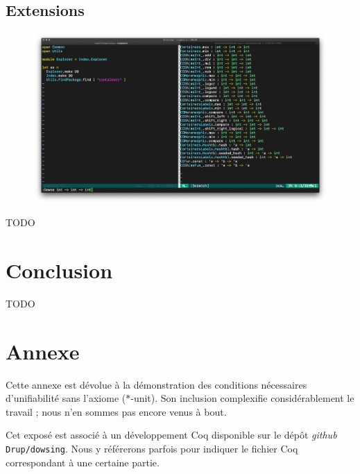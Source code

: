 \documentclass [a4paper] {report}
\theoremstyle {definition}
\begin{document}
\section {Extensions}

\begin {figure} [h]
\begin {center}
	\includegraphics [scale=0.18] {images/vim_plugin}
\end {center}
\end {figure}

TODO


\chapter {Conclusion}

TODO


\chapter* {Annexe}

Cette annexe est dévolue à la démonstration des conditions nécessaires d'unifiabilité sans l'axiome ($*$-unit). Son inclusion complexifie considérablement le travail ; nous n'en sommes pas encore venus à bout.

Cet exposé est associé à un développement Coq disponible sur le dépôt \textit {github} \texttt {Drup/dowsing}. Nous y référerons parfois pour indiquer le fichier Coq correspondant à une certaine partie.
\end{document}
